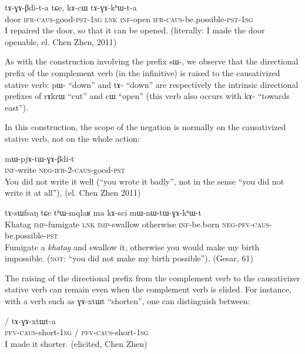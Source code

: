 \documentclass[oldfontcommands,oneside,a4paper,11pt]{article}
\newcommand{\ipa}[1]{{\phon \mbox{#1}}} %
\newcommand{\sg}{\textsc{sg}}
\newcommand{\pfv}{\textsc{pfv}}
\newcommand{\caus}{\textsc{caus}}
\newcommand{\lnk}{\textsc{lnk}}
\newcommand{\evd}{\textsc{ifr}}
\newcommand{\imp}{\textsc{imp}}
\newcommand{\inftv}{\textsc{inf}}
\newcommand{\negat}{\textsc{neg}}
\newcommand{\pst}{\textsc{pst}}
\begin{document}
 \begin{exe}
\ex 
\gll \ipa{kɯm}  	\ipa{tɤ-ɣɤ-βdi-t-a}  	\ipa{tɕe,}  	\ipa{kɤ-cɯ}  	\ipa{tɤ-ɣɤ-kʰɯ-t-a}  	  \\
door \evd{}-\caus{}-good-\pst{}-1\sg{} \lnk{} \inftv{}-open \evd{}-\caus{}-be.possible-\pst{}-1\sg{} \\
 \glt   I repaired the door, so that it can be opened. (literally: I made the door openable, el. Chen Zhen, 2011)
   \end{exe}

    
As with the construction involving the prefix \ipa{sɯ-}, we observe that the directional prefix of the complement verb (in the infinitive) is raised to the causativized stative verb: \ipa{pɯ-} ``down'' and  \ipa{tɤ-} ``down'' are respectively the intrinsic directional prefixes of \ipa{rɤkrɯ} ``cut'' and  \ipa{cɯ} ``open'' (this verb also occurs with \ipa{kɤ-} ``towards east''). 
 
In this construction, the scope of the negation is normally on the causativized stative verb, not on the whole action:
  \begin{exe}
\ex 
 \gll \ipa{kɤ-rɤt} \ipa{mɯ-pjɤ-tɯ-ɣɤ-βdi-t} \\
\inftv{}-write \negat{}-\evd{}-2-\caus{}-good-\pst{} \\
 \glt    You did not write it well (``you wrote it badly'', not in the sense ``you did not write it at all''), (el. Chen Zhen 2011)
   \end{exe}  
   \begin{exe}
\ex 
 \gll  	 \ipa{kʰɤdaʁ}  	\ipa{tɤ-sɯfsaŋ}  	\ipa{tɕe}  	\ipa{tʰɯ-mqlaʁ}  	\ipa{ma}  	\ipa{kɤ-sci}  	\ipa{mɯ-nɯ-tɯ-ɣɤ-kʰɯ-t}  \\
Khatag \imp{}-fumigate \lnk{} \imp{}-swallow otherwise \inftv{}-be.born \negat{}-\pfv{}-\caus{}-be.possible-\pst{} \\
 \glt   Fumigate a \textit{khatag} and swallow it, otherwise you would make my birth impossible. (\textsc{not}: ``you did not make my birth possible''). (Gesar, 61)
   \end{exe}  
   
   
   The raising of the directional prefix from the complement verb to the causativizer stative verb can remain even when the complement verb is elided. For instance, with a verb such as \ipa{ɣɤ-xtɯt} ``shorten'', one can distinguish between:
   
   \begin{exe}
\ex 
 \gll  	 \ipa{nɯ-ɣɤ-xtɯt-a} / \ipa{tɤ-ɣɤ-xtɯt-a}   	   \\
 \pfv{}-\caus{}-short-1\sg{} / \pfv{}-\caus{}-short-1\sg{} \\
 \glt    I made it shorter. (elicited, Chen Zhen)
   \end{exe}     
   
\end{document}
